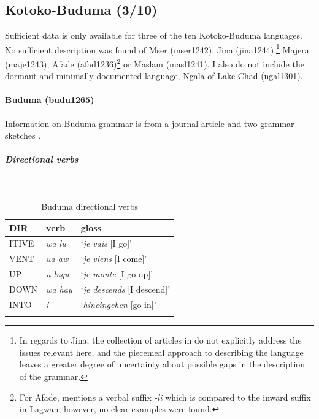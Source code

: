 \subsection{Kotoko-Buduma (3/10)} 

Sufficient data is only available for three of the ten Kotoko-Buduma languages. No sufficient description was found of Mser (mser1242), Jina (jina1244),\footnote{In regards to Jina, the collection of articles in \citet{schmidtAspectsGrammarZina2002} do not explicitly address the issues relevant here, and the piecemeal approach to describing the language leaves a greater degree of uncertainty about possible gaps in the description of the grammar.} Majera (maje1243), Afade (afad1236)\footnote{For Afade, \citet[91]{solkenSeetzensAffadehBeitrag1967} mentions a verbal suffix \textit{-li} which is compared to the inward suffix in Lagwan, however, no clear examples were found.} or Maslam (masl1241). I also do not include the dormant and minimally-documented language, Ngala of Lake Chad (ngal1301).

\paragraph*{Buduma (budu1265)} \label{budu}

Information on Buduma grammar is from a journal article \citep{gaudicheLangueBoudouma1938} and two grammar sketches \citep{lukasSpracheBudumaIm1939,awaganaGrammatikBudumaPhonologie2001}.

\newpage
\subparagraph{Directional verbs}~

\begin{table}[H]
	\caption{Buduma directional verbs} 
	\label{tab:buduV}
	\begin{tabular}{lll} %
		\lsptoprule
		DIR & verb & gloss   \\ %
		\midrule
		ITIVE & \textit{wa lu} & `\textit{je vais} [I go]' \\
		VENT & \textit{ua aw} & `\textit{je viens} [I come]' \\
		UP & \textit{u lugu} & `\textit{je monte} [I go up]' \\
		DOWN & \textit{wa hay} & `\textit{je descends} [I descend]' \\
		INTO & \textit{i} & `\textit{hineingehen} [go in]' \\
		\lspbottomrule
	\end{tabular}
\end{table}

